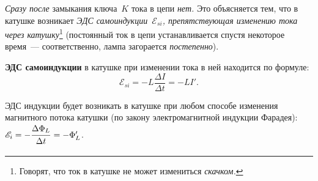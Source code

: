 \documentclass[main.tex]{subfiles}
\begin{document}
\begin{NoHyper}






\emph{Сразу после} замыкания ключа~$K$ тока в цепи \emph{нет.} Это объясняется тем, что в катушке возникает \emph{ЭДС самоиндукции~$\mathscr E_{si}$, препятствующая изменению тока через катушку}\footnote{Говорят, что ток в катушке не может измениться \emph{скачком.}} (постоянный ток в цепи устанавливается спустя некоторое время~--- соответственно, лампа загорается \emph{постепенно}).

\textbf{ЭДС самоиндукции} в катушке при изменении тока в ней находится по формуле:
\begin{equation}
    \mathscr E_{si}=-L\frac{\Delta I}{\Delta t}=-LI'.
\end{equation}

ЭДС индукции будет возникать в катушке при любом способе изменения магнитного потока катушки (по закону электромагнитной индукции Фарадея): $\mathscr E_{i}=-\dfrac{\Delta \Phi_L\strut}{\Delta t\strut}=-\Phi_L'$.






\end{NoHyper}
\end{document}
